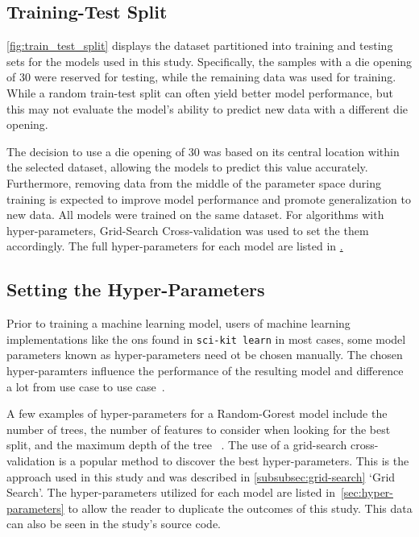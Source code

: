 \subsection{Training-Test Split}\label{subsec:training-test-split}
\cref{fig:train_test_split} displays the dataset partitioned into training and testing sets for the models used in
this study.
Specifically, the samples with a die opening of 30 were reserved for testing, while the remaining data was used for
training.
While a random train-test split can often yield better model performance, but this may not evaluate the model's ability
to predict new data with a different die opening.

The decision to use a die opening of 30 was based on its central location within the selected dataset, allowing the
models to predict this value accurately.
Furthermore, removing data from the middle of the parameter space during
training is expected to improve model performance and promote generalization to new data.
All models were trained on the same dataset.
For algorithms with hyper-parameters, Grid-Search Cross-validation was used to set the them accordingly.
The full hyper-parameters for each model are listed in \href{sec:hyper-parameters}.

\subsection{Setting the Hyper-Parameters}\label{subsec:hyper-parameters}
Prior to training a machine learning model, users of machine learning implementations like the ons found in
\texttt{sci-kit learn}
in most cases, some model parameters known as hyper-parameters need ot be chosen manually.
The chosen hyper-paramters influence the performance of the resulting model and difference a lot from use
case to use case~\cite[pp. 1]{probst2019tunability}.

A few examples of hyper-parameters for a Random-Gorest model \cite{scikit-learn} include the number of trees, the number
of features to consider when looking for the best split, and the maximum depth of the tree
~\cite{scikit-learn}.
The use of a grid-search cross-validation is a popular method to discover the best hyper-parameters.
This is the approach used in this study and was described in \cref{subsubsec:grid-search} `Grid Search'.
The hyper-parameters utilized for each model are listed in~\cref{sec:hyper-parameters} to allow the reader to
duplicate the outcomes of this study.
This data can also be seen in the study's source code.


